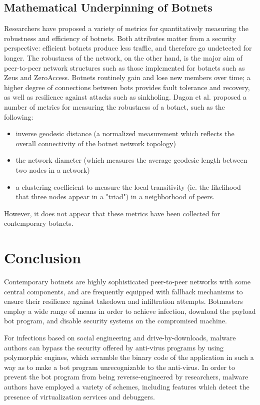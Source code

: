 \documentclass{acm_proc_article-sp}
\begin{document}
\subsection{Mathematical Underpinning of Botnets}

Researchers have proposed a variety of metrics for quantitatively measuring the robustness and efficiency of botnets.  Both attributes matter from a security perspective: efficient botnets produce less traffic, and therefore go undetected for longer.  The robustness of the network, on the other hand, is the major aim of peer-to-peer network structures such as those implemented for botnets such as Zeus and ZeroAccess.  Botnets routinely gain and lose new members over time; a higher degree of connections between bots provides fault tolerance and recovery, as well as resilience against attacks such as sinkholing\cite{botnet:metrics}.  Dagon et al. proposed a number of metrics for measuring the robustness of a botnet, such as the following:

\begin{itemize}
\item inverse geodesic distance (a normalized measurement which reflects the overall connectivity of the botnet network topology)
\item the network diameter (which measures the average geodesic length between two nodes in a network)
\item a clustering coefficient to measure the local transitivity (ie. the likelihood that three nodes appear in a "triad") in a neighborhood of peers.
\end{itemize}

However, it does not appear that these metrics have been collected for contemporary botnets.

\section{Conclusion}

Contemporary botnets are highly sophisticated peer-to-peer networks with some central components, and are frequently equipped with fallback mechanisms to ensure their resilience against takedown and infiltration attempts.  Botmasters employ a wide range of means in order to achieve infection, download the payload bot program, and disable security systems on the compromised machine.

For infections based on social engineering and drive-by-downloads, malware authors can bypass the security offered by anti-virus programs by using polymorphic engines, which scramble the binary code of the application in such a way as to make a bot program unrecognizable to the anti-virus.  In order to prevent the bot program from being reverse-engineered by researchers, malware authors have employed a variety of schemes, including features which detect the presence of virtualization services and debuggers.
\end{document}
